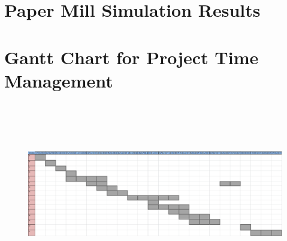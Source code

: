 \section{Paper Mill Simulation Results}

\newpage  
\section{Gantt Chart for Project Time Management}
\pagestyle{empty}
\begin{landscape}
\vspace*{1cm}
\hspace*{-3cm}
\begin{figure}
\includegraphics[width =700px, height=300px]{../Graphics/TimePlanUpdated2.png} \par
\end{figure}
\hspace*{-1cm}
\end{landscape}

